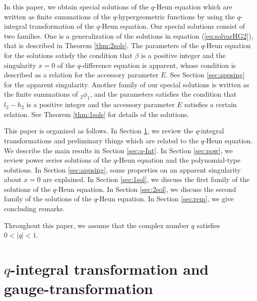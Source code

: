 \documentclass[12pt]{amsart}
\numberwithin{equation}{section}
\theoremstyle{definition}
\theoremstyle{remark}
\begin{document}
In this paper, we obtain special solutions of the $q$-Heun equation which are written as finite summations of the $q$-hypergeometric functions by using the $q$-integral transformation of the $q$-Heun equation.
Our special solutions consist of two families.
One is a generalization of the solutions in equation (\ref{eq:solvarHG2}), that is described in Theorem \ref{thm:2sols}.
The parameters of the $q$-Heun equation for the solutions satisfy the condition that $\beta $ is a positive integer and the singularity $x=0$ of the $q$-difference equation is apparent, whose condition is described as a relation for the accessory parameter $E$.
See Section \ref{sec:appsing} for the apparent singularity.
Another family of our special solutions is written as the finite summations of $_2 \phi _1 $, and the parameters satisfies the condition that $ l_{2} - h_{2} $ is a positive integer and  the accessory parameter $E$ satisfies a certain relation.
See Theorem \ref{thm:1sols} for details of the solutions.

This paper is organized as follows.
In Section \ref{sec:prelqint}, we review the $q$-integral transformations and preliminary things which are related to the $q$-Heun equation.
We describe the main results in Section \ref{sec:q-Int}.
In Section \ref{sec:pow}, we review power series solutions of the $q$-Heun equation and the polynomial-type solutions.
In Section \ref{sec:appsing}, some properties on an apparent singularity about $x=0$ are explained.
In Section \ref{sec:1sol}, we discuss the first family of the solutions of the $q$-Heun equation.
In Section \ref{sec:2sol}, we discuss the second family of the solutions of the $q$-Heun equation.
In Section \ref{sec:rem}, we give concluding remarks.

Throughout this paper, we assume that the complex number $q$ satisfies $0 <|q|<1$.


\section{$q$-integral transformation and gauge-transformation} \label{sec:prelqint}
\end{document}
